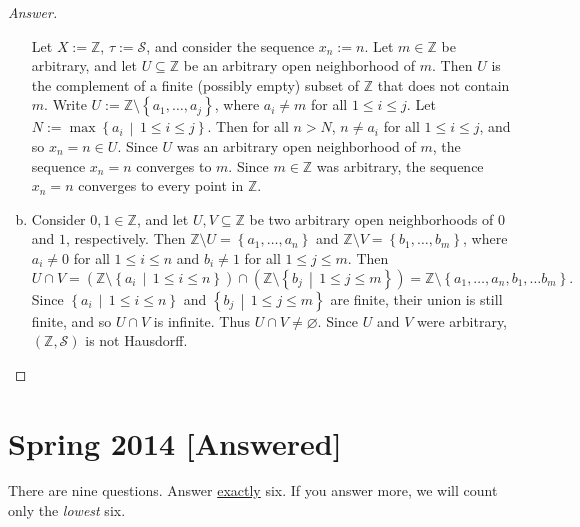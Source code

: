 \documentclass[12pt]{article}
\newcommand{\z}{\mathbb{Z}}
\newcommand{\ita}[1]{\textit{#1}}
\newcommand\paren[1]{\left( #1 \right)}
\newcommand\setb[1]{\left \{ #1 \right \}}
\theoremstyle{definition}
\begin{document}
\begin{proof}[Answer]
\begin{enumerate}[(a)]
        Let $X := \z$, $\tau := \mathcal{S}$, and consider the sequence $x_n := n$. Let $m \in \z$ be arbitrary, and let $U \subseteq \z$ be an arbitrary open neighborhood of $m$. Then $U$ is the complement of a finite (possibly empty) subset of $\z$ that does not contain $m$. Write $U := \z \setminus \setb{ a_1 , \dotsc, a_j }$, where $a_i \neq m$ for all $1 \leq i \leq j$. Let $N := \max \setb{ a_i \, \middle| \, 1 \leq i \leq j }$. Then for all $n > N$, $n \neq a_i$ for all $1 \leq i \leq j$, and so $x_n = n \in U$. Since $U$ was an arbitrary open neighborhood of $m$, the sequence $x_n = n$ converges to $m$. Since $m \in \z$ was arbitrary, the sequence $x_n = n$ converges to every point in $\z$.
        \item Consider $0 , 1 \in \z$, and let $U , V \subseteq \z$ be two arbitrary open neighborhoods of $0$ and $1$, respectively. Then $\z \setminus U = \setb{ a_1 , \dotsc, a_n }$ and $\z \setminus V = \setb{ b_1 , \dotsc , b_m }$, where $a_i \neq 0$ for all $1 \leq i \leq n$ and $b_i \neq 1$ for all $1 \leq j \leq m$. Then 
        \[
            U \cap V = \paren{ \z \setminus \setb{ a_i \, \middle| \, 1 \leq i \leq n } } \cap \paren{ \z \setminus \setb{ b_j \, \middle| \, 1 \leq j \leq m } } = \z \setminus \setb{ a_1 , \dotsc , a_n , b_1 , \dotsc b_m }.
        \]
        Since $\setb{ a_i \, \middle| \, 1 \leq i \leq n }$ and $\setb{ b_j \, \middle| \, 1 \leq j \leq m }$ are finite, their union is still finite, and so $U \cap V$ is infinite. Thus $U \cap V \neq \varnothing$. Since $U$ and $V$ were arbitrary, $(\z,\mathcal{S})$ is not Hausdorff.
    \end{enumerate}
\end{proof}
\newpage
\section{Spring 2014 [Answered]}
There are nine questions. Answer \underline{exactly} six. If you answer more, we will count only the \ita{lowest} six.
\end{document}
